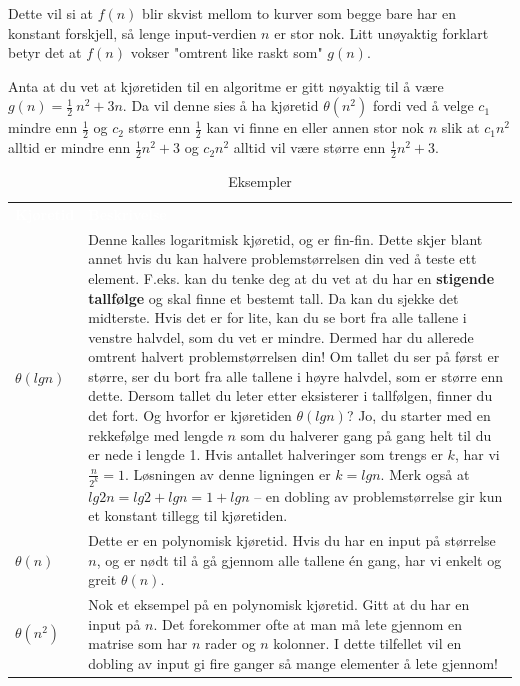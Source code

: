 \noindent Dette vil si at $f(n)$ blir skvist mellom to kurver som begge bare har en konstant forskjell, så lenge input-verdien $n$ er stor nok. Litt unøyaktig forklart betyr det at $f(n)$ vokser "omtrent like raskt som" $g(n)$.

\begin{boxed}
Anta at du vet at kjøretiden til en algoritme er gitt nøyaktig til å være $g(n) = \frac{1}{2}\ n^2 + 3n$. Da vil denne sies å ha kjøretid $\theta(n^2)$ fordi ved å velge $c_1$ mindre enn \(\frac{1}{2}\) og $c_2$ større enn \(\frac{1}{2}\) kan vi finne en eller annen stor nok $n$ slik at $c_1 n^2$ alltid er mindre enn \(\frac{1}{2}\)$n^2 + 3$ og $c_2 n^2$ alltid vil være større enn \(\frac{1}{2}\)$n^2 + 3$.
\end{boxed}

\begin{table}[H]
    \caption{Eksempler}
    \label{tab:kjoretideks}
    \centering
    \begin{tabular}{|L{5em} | L{35em}|}
        \hline
        \textbf{\textcolor{white}{Kjøretid}} & \textbf{\textcolor{white}{Beskrivelse}}\\
        $\theta(lg n)$ & Denne kalles logaritmisk kjøretid, og er fin-fin. Dette skjer blant annet hvis du kan halvere problemstørrelsen din ved å teste ett element. F.eks. kan du tenke deg at du vet at du har en \textbf{stigende tallfølge} og skal finne et bestemt tall. Da kan du sjekke det midterste. Hvis det er for lite, kan du se bort fra alle tallene i venstre halvdel, som du vet er mindre. Dermed har du allerede omtrent halvert problemstørrelsen din! Om tallet du ser på først er større, ser du bort fra alle tallene i høyre halvdel, som er større enn dette. Dersom tallet du leter etter eksisterer i tallfølgen, finner du det fort. Og hvorfor er kjøretiden $\theta(lg n)$? Jo, du starter med en rekkefølge med lengde $n$ som du halverer gang på gang helt til du er nede i lengde 1. Hvis antallet halveringer som trengs er $k$, har vi \(\frac{n}{2^k}\)$ = 1$. Løsningen av denne ligningen er $k = lg n$. Merk også at $lg 2n = lg 2 + lg n = 1 + lg n$ – en dobling av problemstørrelse gir kun et konstant tillegg til kjøretiden. \\
        $\theta(n)$ & Dette er en polynomisk kjøretid. Hvis du har en input på størrelse $n$, og er nødt til å gå gjennom alle tallene én gang, har vi enkelt og greit $\theta(n)$.\\
        $\theta(n^2)$ & Nok et eksempel på en polynomisk kjøretid. Gitt at du har en input på $n$. Det forekommer ofte at man må lete gjennom en matrise som har $n$ rader og $n$ kolonner. I dette tilfellet vil en dobling av input gi fire ganger så mange elementer å lete gjennom!\\

\end{tabular}
\end{table}

